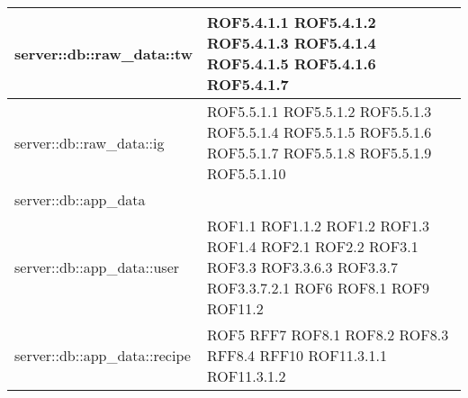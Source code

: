 \begin{center}
\begin{longtable}{| p{9cm} | p{4cm} |}
\hline
server::db::raw\_data::tw  & ROF5.4.1.1 \newline ROF5.4.1.2 \newline ROF5.4.1.3 \newline ROF5.4.1.4 \newline ROF5.4.1.5 \newline ROF5.4.1.6  \newline ROF5.4.1.7 \newline \\
\hline
server::db::raw\_data::ig  & ROF5.5.1.1 \newline ROF5.5.1.2 \newline ROF5.5.1.3 \newline ROF5.5.1.4 \newline ROF5.5.1.5 \newline ROF5.5.1.6  \newline ROF5.5.1.7 \newline ROF5.5.1.8 \newline ROF5.5.1.9 \newline ROF5.5.1.10 \newline \\
\hline
server::db::app\_data  &   \newline\\
\hline
server::db::app\_data::user  &  ROF1.1 \newline ROF1.1.2 \newline ROF1.2 \newline ROF1.3 \newline ROF1.4 \newline ROF2.1 \newline ROF2.2 \newline ROF3.1 \newline ROF3.3 \newline ROF3.3.6.3 \newline ROF3.3.7 \newline ROF3.3.7.2.1 \newline ROF6 \newline ROF8.1 \newline ROF9 \newline ROF11.2 \newline \\
\hline
server::db::app\_data::recipe &  ROF5 \newline RFF7 \newline ROF8.1 \newline ROF8.2 \newline ROF8.3 \newline RFF8.4 \newline RFF10 \newline ROF11.3.1.1 \newline ROF11.3.1.2 \newline \\

\end{longtable}
\end{center}
